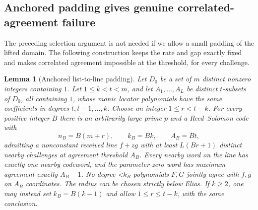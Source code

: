\documentclass[11pt,letterpaper]{article}
\newtheorem{lemma}[theorem]{Lemma}
\theoremstyle{definition}
\theoremstyle{remark}
\begin{document}
\subsection{Anchored padding gives genuine correlated-agreement failure}
\label{sec:anchored-padding}

The preceding selection argument is not needed if we allow a small
padding of the lifted domain. The following construction keeps the
rate and gap exactly fixed and makes correlated agreement impossible
at the threshold, for every challenge.

\begin{lemma}[Anchored list-to-line padding]\label{fg:anchored-padding}
Let $D_0$ be a set of $m$ distinct nonzero integers containing $1$.
Let $1\le k<t<m$, and let $A_1,\ldots,A_L$ be distinct $t$-subsets
of $D_0$, all containing $1$, whose monic locator
polynomials have the same coefficients in degrees $t,t-1,\ldots,k$.
Choose an integer $1\le r<t-k$. For every positive integer $B$
there is an arbitrarily large prime $p$ and a Reed--Solomon code with
\[
 n_B=B(m+r),\qquad k_B=Bk,\qquad A_B=Bt,
\]
admitting a nonconstant received line $f+zg$ with at least $L(Br+1)$
distinct nearby challenges at agreement threshold $A_B$.
Every nearby word on the line has exactly one nearby codeword, and
the parameter-zero word has maximum agreement exactly $A_B-1$.
No degree-<$k_B$ polynomials $F,G$ jointly agree with $f,g$ on
$A_B$ coordinates. The radius can be chosen strictly below Elias.
If $k\ge2$, one may instead set $k_B=B(k-1)$ and allow
$1\le r\le t-k$, with the same conclusion.
\end{lemma}
\end{document}
